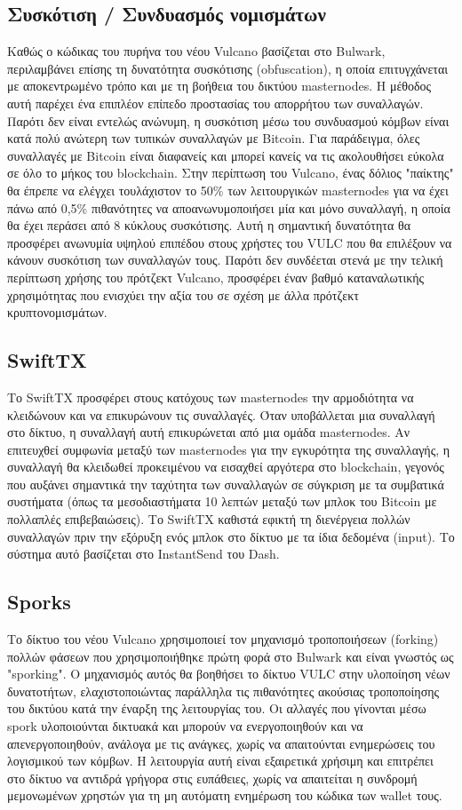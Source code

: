 \documentclass[A4paper, 12pt]{article}
\begin{document}
\subsection{Συσκότιση / Συνδυασμός νομισμάτων}
Καθώς ο κώδικας του πυρήνα του νέου Vulcano βασίζεται στο Bulwark, περιλαμβάνει επίσης τη δυνατότητα συσκότισης (obfuscation), η οποία επιτυγχάνεται με αποκεντρωμένο τρόπο και με τη βοήθεια του δικτύου masternodes. Η μέθοδος αυτή παρέχει ένα επιπλέον επίπεδο προστασίας του απορρήτου των συναλλαγών. Παρότι δεν είναι εντελώς ανώνυμη, η συσκότιση μέσω του συνδυασμού κόμβων είναι κατά πολύ ανώτερη των τυπικών συναλλαγών με Bitcoin. Για παράδειγμα, όλες συναλλαγές με Bitcoin είναι διαφανείς και μπορεί κανείς να τις ακολουθήσει εύκολα σε όλο το μήκος του blockchain. Στην περίπτωση του Vulcano, ένας δόλιος "παίκτης" θα έπρεπε να ελέγχει τουλάχιστον το 50\% των λειτουργικών masternodes για να έχει πάνω από 0,5\% πιθανότητες να αποανωνυμοποιήσει μία και μόνο συναλλαγή, η οποία θα έχει περάσει από 8 κύκλους συσκότισης. Αυτή η σημαντική δυνατότητα θα προσφέρει ανωνυμία υψηλού επιπέδου στους χρήστες του VULC που θα επιλέξουν να κάνουν συσκότιση των συναλλαγών τους. Παρότι δεν συνδέεται στενά με την τελική περίπτωση χρήσης του πρότζεκτ Vulcano, προσφέρει έναν βαθμό καταναλωτικής χρησιμότητας που ενισχύει την αξία του σε σχέση με άλλα πρότζεκτ κρυπτονομισμάτων.

\subsection{SwiftTX}
Το SwiftTX προσφέρει στους κατόχους των masternodes την αρμοδιότητα να κλειδώνουν και να επικυρώνουν τις συναλλαγές. Όταν υποβάλλεται μια συναλλαγή στο δίκτυο, η συναλλαγή αυτή επικυρώνεται από μια ομάδα masternodes. Αν επιτευχθεί συμφωνία μεταξύ των masternodes για την εγκυρότητα της συναλλαγής, η συναλλαγή θα κλειδωθεί προκειμένου να εισαχθεί αργότερα στο blockchain, γεγονός που αυξάνει σημαντικά την ταχύτητα των συναλλαγών σε σύγκριση με τα συμβατικά συστήματα (όπως τα μεσοδιαστήματα 10 λεπτών μεταξύ των μπλοκ του Bitcoin με πολλαπλές επιβεβαιώσεις). Το SwiftTX καθιστά εφικτή τη διενέργεια πολλών συναλλαγών πριν την εξόρυξη ενός μπλοκ στο δίκτυο με τα ίδια δεδομένα (input). Το σύστημα αυτό βασίζεται στο InstantSend του Dash.

\subsection{Sporks}
Το δίκτυο του νέου Vulcano χρησιμοποιεί τον μηχανισμό τροποποιήσεων (forking) πολλών φάσεων που χρησιμοποιήθηκε πρώτη φορά στο Bulwark και είναι γνωστός ως "sporking". Ο μηχανισμός αυτός θα βοηθήσει το δίκτυο VULC στην υλοποίηση νέων δυνατοτήτων, ελαχιστοποιώντας παράλληλα τις πιθανότητες ακούσιας τροποποίησης του δικτύου κατά την έναρξη της λειτουργίας του. Οι αλλαγές που γίνονται μέσω spork υλοποιούνται δικτυακά και μπορούν να ενεργοποιηθούν και να απενεργοποιηθούν, ανάλογα με τις ανάγκες, χωρίς να απαιτούνται ενημερώσεις του λογισμικού των κόμβων. Η λειτουργία αυτή είναι εξαιρετικά χρήσιμη και επιτρέπει στο δίκτυο να αντιδρά γρήγορα στις ευπάθειες, χωρίς να απαιτείται η συνδρομή μεμονωμένων χρηστών για τη μη αυτόματη ενημέρωση του κώδικα των wallet τους.
\end{document}
